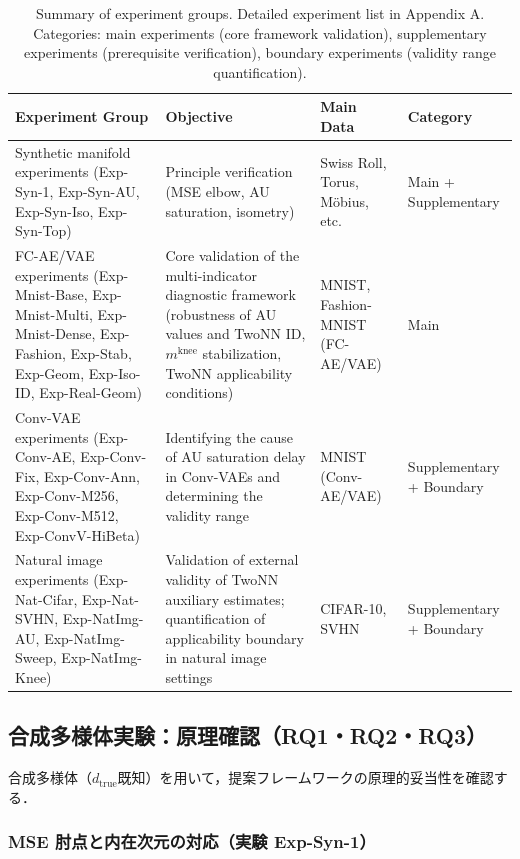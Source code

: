 \documentclass[11pt,a4paper]{jsarticle}
\newcommand{\dtrue}{d_{\mathrm{true}}}
\newcommand{\mknee}{m^{\mathrm{knee}}}
\begin{document}
\begin{table}[H]
\centering
\caption{Summary of experiment groups. Detailed experiment list in Appendix A. Categories: main experiments (core framework validation), supplementary experiments (prerequisite verification), boundary experiments (validity range quantification).}
\label{tab:exp_list}
\small
\begin{tabular}{p{4.5cm}p{4.0cm}p{3.0cm}p{2.5cm}}
\toprule
Experiment Group & Objective & Main Data & Category \\
\midrule
Synthetic manifold experiments
(Exp-Syn-1, Exp-Syn-AU, Exp-Syn-Iso, Exp-Syn-Top)
  & Principle verification (MSE elbow, AU saturation, isometry)
  & Swiss Roll, Torus, Möbius, etc.
  & Main + Supplementary \\
\addlinespace
FC-AE/VAE experiments
(Exp-Mnist-Base, Exp-Mnist-Multi, Exp-Mnist-Dense, Exp-Fashion, Exp-Stab, Exp-Geom, Exp-Iso-ID, Exp-Real-Geom)
  & Core validation of the multi-indicator diagnostic framework (robustness of AU values and TwoNN ID, $\mknee$ stabilization, TwoNN applicability conditions)
  & MNIST, Fashion-MNIST (FC-AE/VAE)
  & Main \\
\addlinespace
Conv-VAE experiments
(Exp-Conv-AE, Exp-Conv-Fix, Exp-Conv-Ann, Exp-Conv-M256, Exp-Conv-M512, Exp-ConvV-HiBeta)
  & Identifying the cause of AU saturation delay in Conv-VAEs and determining the validity range
  & MNIST (Conv-AE/VAE)
  & Supplementary + Boundary \\
\addlinespace
Natural image experiments
(Exp-Nat-Cifar, Exp-Nat-SVHN, Exp-NatImg-AU, Exp-NatImg-Sweep, Exp-NatImg-Knee)
  & Validation of external validity of TwoNN auxiliary estimates; quantification of applicability boundary in natural image settings
  & CIFAR-10, SVHN
  & Supplementary + Boundary \\
\bottomrule
\end{tabular}
\end{table}

\subsection{合成多様体実験：原理確認（RQ1・RQ2・RQ3）}\label{sec:exp_synthetic}

合成多様体（$\dtrue$既知）を用いて，提案フレームワークの原理的妥当性を確認する．

\subsubsection{MSE 肘点と内在次元の対応（実験 Exp-Syn-1）}
\end{document}
